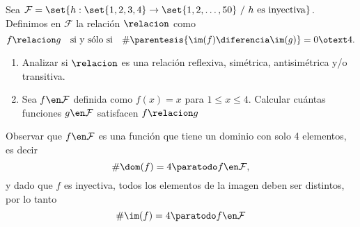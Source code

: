 \ejExtra
\def\F{\mathcal F}


Sea
$
  \F = \set{h : \set{1,2,3,4} \to \set{1,2,\dots, 50} \ /\  h \text{ es inyectiva}}
$.\\
Definimos en $\F$ la relación $\relacion$ como
$$
  f \relacion g \quad \text{si y sólo si} \quad \# \parentesis{ \im(f) \diferencia \im(g) } = 0 \otext 4.
$$
\begin{enumerate}[label=\alph*)]
  \item Analizar si $\relacion$ es una relación reflexiva, simétrica, antisimétrica y/o transitiva.

  \item Sea
        $f \en \F$
        definida como $f(x) = x$ para $1 \leq x \leq 4$. Calcular cuántas funciones $g \en \F$
        satisfacen $f \relacion g$
\end{enumerate}

\separadorCorto

Observar que $f \en \F$ es una función que tiene un dominio con solo 4 elementos, es decir
$$
  \# \dom(f) = 4 \paratodo f \en \F,
$$
y dado que $f$ es inyectiva, todos los elementos de la imagen deben ser distintos, por lo tanto
$$
  \# \im(f) = 4 \paratodo f \en \F
$$

